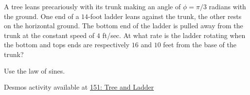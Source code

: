 \documentclass{ximera}
\begin{document}
\begin{question}  \label{Qdsfgnbn444}
A tree leans precariously with its trunk making an angle of $\phi = \pi/3$ radians with the ground. One end of a $14$-foot ladder leans against the trunk, the other rests on the horizontal ground. The bottom end of the ladder is pulled away from the trunk at the constant speed of $4$ ft/sec. At what rate is the ladder rotating when the bottom and tops ends are respectively $16$ and $10$ feet from the base of the trunk?

\begin{hint}
Use the law of sines.
\end{hint}

\begin{onlineOnly}
    \begin{center}
\end{center}
\end{onlineOnly}

Desmos activity available at \href{https://www.desmos.com/calculator/rpms2jqfpm}{151: Tree and Ladder}

\end{question}
\end{document}
